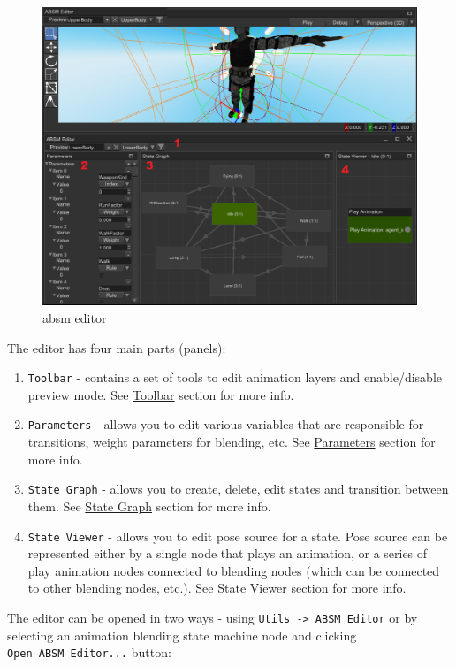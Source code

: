 \documentclass[
]{book}
\providecommand{\tightlist}{%
  \setlength{\itemsep}{0pt}\setlength{\parskip}{0pt}}
\theoremstyle{definition}
\theoremstyle{definition}
\theoremstyle{definition}
\theoremstyle{definition}
\theoremstyle{remark}
\begin{document}
\begin{figure}
\centering
\includegraphics{images/animation/absm.png}
\caption{absm editor}
\end{figure}

The editor has four main parts (panels):

\begin{enumerate}
\def\labelenumi{\arabic{enumi}.}
\tightlist
\item
  \texttt{Toolbar} - contains a set of tools to edit animation layers and enable/disable preview mode. See \hyperref[toolbar]{Toolbar} section for more info.
\item
  \texttt{Parameters} - allows you to edit various variables that are responsible for transitions, weight parameters for blending, etc. See \href{./absm_parameters.png}{Parameters} section for more info.
\item
  \texttt{State\ Graph} - allows you to create, delete, edit states and transition between them. See \hyperref[state-graph]{State Graph} section for more info.
\item
  \texttt{State\ Viewer} - allows you to edit pose source for a state. Pose source can be represented either by a single node that plays an animation, or a series of play animation nodes connected to blending nodes (which can be connected to other blending nodes, etc.). See \hyperref[state-viewer]{State Viewer} section for more info.
\end{enumerate}

The editor can be opened in two ways - using \texttt{Utils\ -\textgreater{}\ ABSM\ Editor} or by selecting an animation blending state machine node and clicking \texttt{Open\ ABSM\ Editor...} button:
\end{document}
